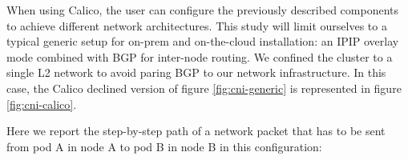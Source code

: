 
When using Calico, the user can configure the previously described components to
achieve different network architectures. This study will limit ourselves to a
typical generic setup for on-prem and on-the-cloud installation: an IPIP overlay
mode combined with BGP for inter-node routing. We confined the cluster to a
single L2 network to avoid paring BGP to our network infrastructure. In this
case, the Calico declined version of figure \ref{fig:cni-generic} is represented
in figure \ref{fig:cni-calico}. 

Here we report the step-by-step path of a network packet that has to be sent
from pod A in node A to pod B in node B in this configuration:

